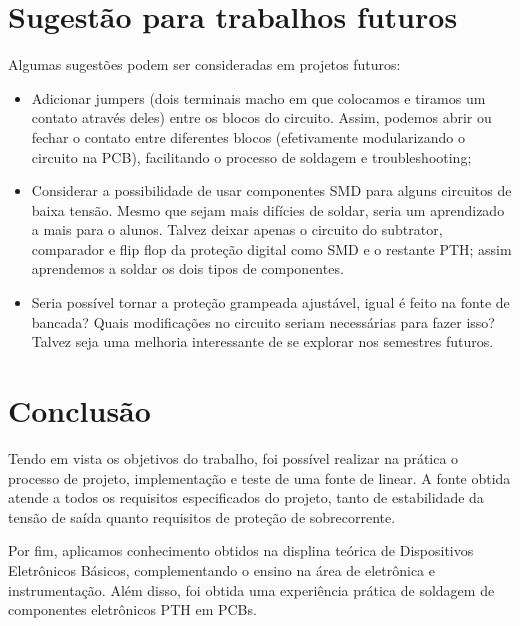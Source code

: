 \documentclass[
	12pt,				%
	oneside,			%
	a4paper,			%
	chapter=TITLE,
	sumario=tradicional,
	english,			%
	brazil				%
]{abntex2}
\begin{document}
\chapter{Sugestão para trabalhos futuros}\label{cap:surgestao} 

Algumas sugestões podem ser consideradas em projetos futuros:

\begin{itemize}
    \item Adicionar jumpers (dois terminais macho em que colocamos e tiramos um contato através deles)
    entre os blocos do circuito. Assim, podemos abrir ou fechar 
    o contato entre diferentes blocos (efetivamente modularizando o circuito na PCB), facilitando o processo de soldagem e troubleshooting; 
    \item Considerar a possibilidade de usar componentes SMD para alguns circuitos de baixa tensão.
    Mesmo que sejam mais difícies de soldar, seria um aprendizado a mais para o alunos. Talvez deixar apenas o circuito 
    do subtrator, comparador e flip flop da proteção digital como SMD e o restante PTH; assim aprendemos a soldar 
    os dois tipos de componentes. 
    \item Seria possível tornar a proteção grampeada ajustável, igual é feito na fonte de bancada? 
    Quais modificações no circuito seriam necessárias para fazer isso? Talvez seja uma melhoria interessante de 
    se explorar nos semestres futuros.
\end{itemize}

\chapter{Conclusão}\label{cap:conclusao} 

Tendo em vista os objetivos do trabalho, foi possível realizar na prática o processo
de projeto, implementação e teste de uma fonte de linear. A fonte obtida atende a todos os 
requisitos especificados do projeto, tanto de estabilidade da tensão de saída quanto
requisitos de proteção de sobrecorrente.

Por fim, aplicamos conhecimento obtidos 
na displina teórica de Dispositivos Eletrônicos Básicos, complementando o ensino na área de 
eletrônica e instrumentação. Além disso, foi obtida uma experiência prática de soldagem de 
componentes eletrônicos PTH em PCBs.
\end{document}
